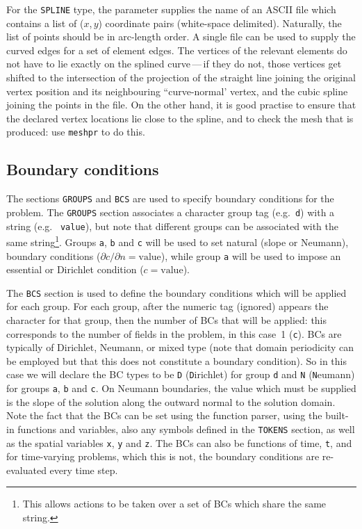 \documentclass[11pt]{report}
\newcommand{\eg}{e.g.\ } \newcommand{\CC}{\mathrm{c.c.}}
\begin{document}
For the \texttt{SPLINE} type, the parameter supplies the name of an
ASCII file which contains a list of ($x$,\,$y$) coordinate pairs
(white-space delimited). Naturally, the list of points should be in
arc-length order. A single file can be used to supply the curved edges
for a set of element edges. The vertices of the relevant elements do
not have to lie exactly on the splined curve\,---\,if they do not,
those vertices get shifted to the intersection of the projection of
the straight line joining the original vertex position and its
neighbouring ``curve-normal' vertex, and the cubic spline joining the
points in the file. On the other hand, it is good practise to ensure
that the declared vertex locations lie close to the spline, and to
check the mesh that is produced: use \texttt{meshpr} to do this.

\subsection{Boundary conditions}

The sections \texttt{GROUPS} and \texttt{BCS} are used to specify
boundary conditions for the problem.  The \texttt{GROUPS} section
associates a character group tag (\eg \verb+d+) with a string (\eg
\verb+value+), but note that different groups can be associated with
the same string\footnote{This allows actions to be taken over a set of
  BCs which share the same string.}.  Groups \verb+a+, \verb+b+ and
\verb+c+ will be used to set natural (\ie slope or Neumann), boundary
conditions ($\partial c/\partial n=\textrm{value}$), while group
\verb+a+ will be used to impose an essential or Dirichlet condition
($c=\textrm{value}$).

The \texttt{BCS} section is used to define the boundary conditions
which will be applied for each group.  For each group, after the
numeric tag (ignored) appears the character for that group, then the
number of BCs that will be applied: this corresponds to the number of
fields in the problem, in this case~1 (\verb+c+).  BCs are typically
of Dirichlet, Neumann, or mixed type (note that domain periodicity can
be employed but that this does not constitute a boundary condition).
So in this case we will declare the BC types to be \verb+D+ ({\texttt
  D}irichlet) for group \verb+d+ and \verb+N+ ({\texttt N}eumann) for
groups \verb+a+, \verb+b+ and \verb+c+.  On Neumann boundaries, the
value which must be supplied is the slope of the solution along the
outward normal to the solution domain.  Note the fact that the BCs can
be set using the function parser, using the built-in functions and
variables, also any symbols defined in the \texttt{TOKENS} section, as
well as the spatial variables \verb+x+, \verb+y+ and \verb+z+.  The
BCs can also be functions of time, \verb+t+, and for time-varying
problems, which this is not, the boundary conditions are re-evaluated
every time step.
\end{document}
